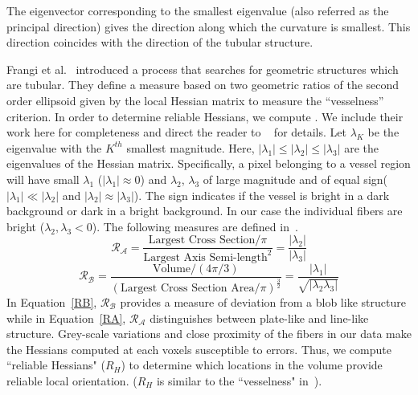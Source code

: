 The eigenvector corresponding to the smallest eigenvalue (also referred as the principal direction) gives the direction along which the curvature is smallest. This direction coincides with the direction of the tubular structure.

Frangi et al.~\cite{Frangi1998} introduced a process that searches for geometric structures which are tubular. They define a measure based on two geometric ratios of the second order ellipsoid given by the local Hessian matrix to measure the ``vesselness'' criterion.  In order to determine reliable Hessians, we compute 
\color{red}{ the same metric} \color{blue}{a similar metric}\color{black}. We include their work here for completeness and direct the reader to ~\cite{Frangi1998} for details. Let $\lambda_{K}$ be the eigenvalue with the $K^{th}$ smallest magnitude. Here, $|{\lambda}_{1}| \leq| {\lambda}_{2}|\leq| {\lambda}_{3}| $ are the eigenvalues of the Hessian matrix. Specifically, a pixel belonging to a vessel region will have small $\lambda_{1}$ ($|\lambda_{1}|\approx 0$) and $\lambda_{2}$, $\lambda_{3}$ of large magnitude and of equal sign($|\lambda_{1}| \ll |\lambda_{2}|$ and $|\lambda_{2}|\approx |\lambda_{3}|$). The sign indicates if the vessel is bright in a dark background or dark in a bright background. In our case the individual fibers are bright ($\lambda_2,\lambda_3 < 0$). The following measures are defined in~\cite{Frangi1998}.  
\begin{equation}\label{RA}
\mathcal{R_{A}}=\frac{\textrm{Largest  Cross Section}\big/ \pi}{{\textrm{Largest Axis Semi-length}}^{2}}=\frac{|\lambda_{2}|}{|\lambda_{3}|}
\end{equation}
\begin{equation}\label{RB}
\mathcal{R_{B}}=\frac{\textrm{Volume}\big/ (4\pi \big/ 3)}{{(\textrm{Largest Cross Section Area}\big/ \pi)}^{\frac{3}{2}}}=\frac{|\lambda_{1}|}{\sqrt{|\lambda_{2}\lambda_{3}|}}
\end{equation}
In Equation~\ref{RB}, $\mathcal{R_{B}}$ provides a measure of deviation from a blob like structure while in Equation~\ref{RA}, $\mathcal{R_{A}}$ distinguishes between plate-like and line-like structure. Grey-scale variations and close proximity of the fibers in our data make the Hessians computed at each voxels susceptible to errors. Thus, we compute ``reliable Hessians" ($R_H$) to determine which locations in the volume provide reliable local orientation. ($R_H$ is similar to the ``vesselness" in~\cite{Frangi1998}).
